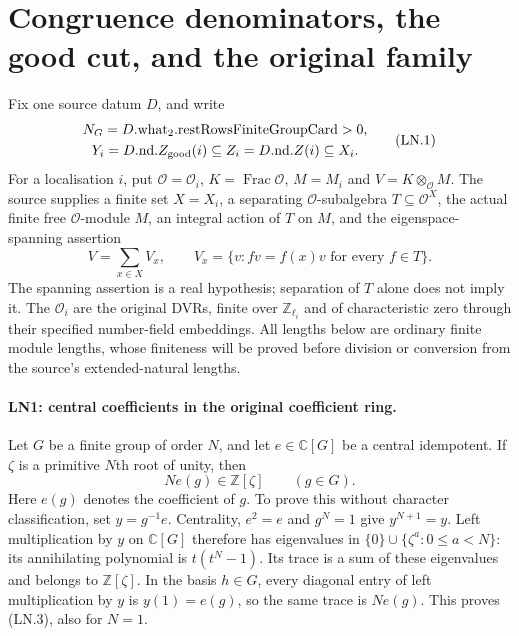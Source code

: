 \section{Congruence denominators, the good cut, and the original family}
\label{sec:congruence-chain}


Fix one source datum $D$, and write
\[
 \begin{gathered}
 N_G=D.\mathrm{what}_2.\mathrm{restRowsFiniteGroupCard}>0,\\
 Y_i=D.\mathrm{nd}.Z_{\rm good}(i)\subseteq
 Z_i=D.\mathrm{nd}.Z(i)\subseteq X_i.
 \end{gathered}
 \tag{LN.1}
\]
For a localisation $i$, put $\mathcal O=\mathcal O_i$, $K=\operatorname{Frac}
\mathcal O$, $M=M_i$ and $V=K\otimes_{\mathcal O}M$.  The source supplies
a finite set $X=X_i$, a separating $\mathcal O$-subalgebra
$T\subseteq\mathcal O^X$, the actual finite free $\mathcal O$-module
$M$, an integral action of $T$ on $M$, and the
eigenspace-spanning assertion
\[
 V=\sum_{x\in X}V_x,\qquad
 V_x=\{v:f v=f(x)v\text{ for every }f\in T\}.
 \tag{LN.2}
\]
The spanning assertion is a real hypothesis; separation of $T$ alone
does not imply it.  The $\mathcal O_i$ are the original DVRs, finite
over $\mathbb Z_{\ell_i}$ and of characteristic zero through their
specified number-field embeddings.  All lengths below are ordinary
finite module lengths, whose finiteness will be proved before division
or conversion from the source's extended-natural lengths.

\paragraph{LN1: central coefficients in the original coefficient ring.}
\label{claim:LN1}
Let $G$ be a finite group of order $N$, and let
$e\in\mathbb C[G]$ be a central idempotent.  If $\zeta$ is a primitive
$N$th root of unity, then
\[
                   N e(g)\in\mathbb Z[\zeta]\qquad(g\in G).
 \tag{LN.3}
\]
Here $e(g)$ denotes the coefficient of $g$.  To prove this without
character classification, set $y=g^{-1}e$.  Centrality, $e^2=e$ and
$g^N=1$ give $y^{N+1}=y$.  Left multiplication by $y$ on
$\mathbb C[G]$ therefore has eigenvalues in
$\{0\}\cup\{\zeta^a:0\le a<N\}$: its annihilating polynomial is
$t(t^N-1)$.  Its trace is a sum of these eigenvalues and belongs to
$\mathbb Z[\zeta]$.  In the basis $h\in G$, every diagonal entry of
left multiplication by $y$ is $y(1)=e(g)$, so the same trace is
$Ne(g)$.  This proves (LN.3), also for $N=1$.

